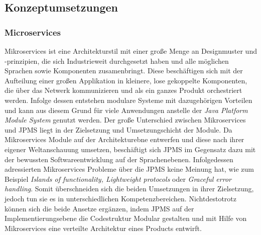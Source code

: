 \subsection{Konzeptumsetzungen}

\subsubsection{Microservices}
  Mikroservices ist eine Architekturstil mit einer große Menge an Designmuster und -prinzipien, die sich Industrieweit durchgesetzt haben und alle möglichen Sprachen sowie Komponenten zusamenbringt. 
  Diese beschäftigen sich mit der Aufteilung einer großen Applikation in kleinere, lose gekoppelte Komponenten, die über das Netwerk kommunizieren und als ein ganzes Produkt orchestriert werden.
  Infolge dessen entstehen modulare Systeme mit dazugehörigen Vorteilen und kann aus diesem Grund für viele Anwendungen anstelle der \textit{Java Platform Module System} genutzt werden.
  \bigbreak Der große Unterschied zwischen Mikroservices und JPMS liegt in der Zielsetzung und Umsetzungschicht der Module. 
  Da Mikroservices Module auf der Architekturebne entwerfen und diese nach ihrer eigener Weltanschauung umsetzen, beschäftigt sich JPMS im Gegensatz dazu mit der bewussten Softwareentwicklung auf der Sprachenebenen.
  Infolgedessen adressierten Mikroservices Probleme über die JPMS keine Meinung hat, wie zum Beispiel \textit{Islands of functionality, Lightweight protocols} oder \textit{Graceful error handling}. Somit überschneiden sich die beiden Umsetzungen in ihrer Zielsetzung, jedoch tun sie es in unterschiedlichen Kompetenzbereichen.  
  \bigbreak Nichtdestotrotz können sich die beide Ansetze ergänzen, indem JPMS auf der Implementierungsebene die Codestruktur Modular gestalten und mit Hilfe von Mikroservices eine verteilte Architektur eines Products entwirft. 

